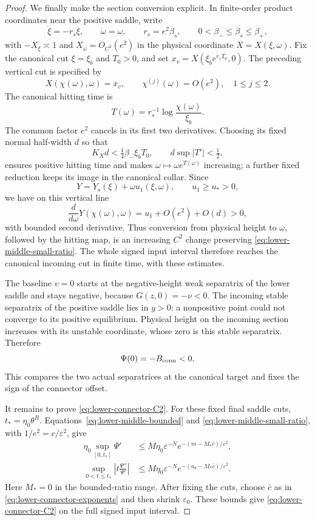\begin{proof}
We finally make the section conversion explicit.  In finite-order product
coordinates near the positive saddle, write
\[
 \dot\xi=-r_s\xi,\qquad \dot\omega=\omega,\qquad
 r_s=e^2\beta_s,\qquad 0<\beta_-\le\beta_s\le\beta_+,
\]
with $-X_\xi\asymp1$ and $X_\omega=O_{C^2}(e^2)$ in the physical
coordinate $X=X(\xi,\omega)$.  Fix the canonical cut $\xi=\xi_b$ and
$T_0>0$, and set $x_v=X(\xi_be^{r_sT_0},0)$.  The preceding vertical cut is
specified by
\[
 X(\chi(\omega),\omega)=x_v,
\qquad \chi^{(j)}(\omega)=O(e^2),\quad 1\le j\le2.
\]
The canonical hitting time is
\[
 T(\omega)=r_s^{-1}\log \frac{\chi(\omega)}{\xi_b}.
\]
The common factor $e^2$ cancels in its first two derivatives.  Choosing
its fixed normal half-width $d$ so that
\[
 K_Xd<\tfrac14\beta_-\xi_bT_0,\qquad
 d\sup|T'|<\tfrac12,
\]
ensures positive hitting time and makes
$\omega\mapsto\omega e^{T(\omega)}$ increasing; a further fixed reduction
keeps its image in the canonical collar.  Since
\[
 Y=Y_s(\xi)+\omega u_1(\xi,\omega),\qquad u_1\ge u_*>0,
\]
we have on this vertical line
\[
 \frac{d}{d\omega}Y(\chi(\omega),\omega)=u_1+O(e^2)+O(d)>0,
\]
with bounded second derivative.  Thus conversion from physical
height to $\omega$, followed by the hitting map, is an increasing $C^2$
change preserving \eqref{eq:lower-middle-small-ratio}. The whole signed
input interval therefore reaches the canonical incoming cut in finite
time, with these estimates.


The baseline $v=0$ starts at the negative-height weak separatrix of the
lower saddle and stays negative, because $G(z,0)=-\nu<0$. The incoming
stable separatrix of the positive saddle lies in $y>0$: a nonpositive
point could not converge to its positive equilibrium. Physical height
on the incoming section increases with its unstable coordinate, whose
zero is this stable separatrix. Therefore
\begin{equation}\label{eq:lower-negative-offset}
 \Psi(0)=-B_{\rm conn}<0.
\end{equation}
This compares the two actual separatrices at the canonical target and
fixes the sign of the connector offset.

It remains to prove \eqref{eq:lower-connector-C2}. For these fixed final
saddle cuts, $t_*=\eta_0\theta^R$.
Equations~\eqref{eq:lower-middle-bounded} and
\eqref{eq:lower-middle-small-ratio}, with $1/e^2=c/\varepsilon^2$, give
\[
\begin{aligned}
 \eta_0\sup_{[0,t_*]}\Psi'
 &\le M\eta_0\varepsilon^{-N}
       e^{-(m-M_*\bar c)/\varepsilon^2},\\
 \sup_{0<t\le t_*}\left|t\frac{\Psi''}{\Psi'}\right|
 &\le M\eta_0\varepsilon^{-N}
       e^{-(a_\theta-M_*\bar c)/\varepsilon^2}.
\end{aligned}
\]
Here $M_*=0$ in the bounded-ratio range. After fixing the cuts,
choose $\bar c$ as in \eqref{eq:lower-connector-exponents} and then
shrink $\varepsilon_0$. These bounds give \eqref{eq:lower-connector-C2}
on the full signed input interval.
\end{proof}

